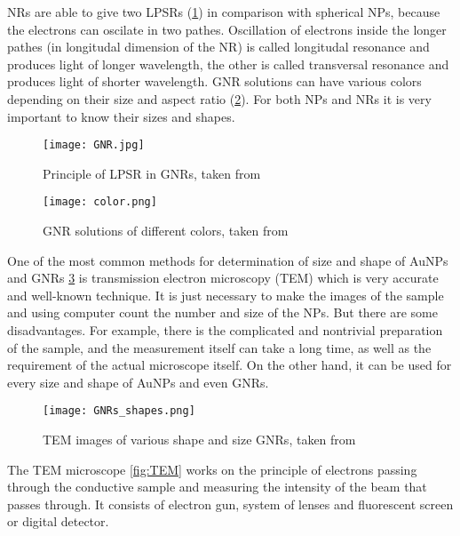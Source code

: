         NRs are able to give two LPSRs (\ref{fig:GNR}) in comparison with spherical NPs, because the electrons can oscilate in two pathes. Oscillation of electrons inside the longer pathes
        (in longitudal dimension of the NR) is called longitudal resonance and produces light of longer wavelength, the other is called transversal resonance and
        produces light of shorter wavelength. GNR solutions can have various colors depending on their size and aspect ratio (\ref{fig:color}). \cite{4, 5, 6, 7, 8}
        For both NPs and NRs it is very important to know their sizes and shapes.
        
        \begin{figure}[h]
            \texttt{[image: GNR.jpg]}
            \caption{Principle of LPSR in GNRs, taken from \cite{19}}
            \label{fig:GNR}
        \end{figure}

        \begin{figure}[h]
            \texttt{[image: color.png]}
            \caption{GNR solutions of different colors, taken from \cite{32}}
            \label{fig:color}
        \end{figure}

        One of the most common methods for determination of size and shape of AuNPs and GNRs \ref{fig:GNR_shape} is transmission electron microscopy (TEM) which is very accurate and well-known technique.
        It is just necessary to make the images of the sample and using computer count the number and size of the NPs. But there are some disadvantages. For example,
        there is the complicated and nontrivial preparation of the sample, and the measurement itself can take a long time, as well as the requirement of the actual microscope itself.
        On the other hand, it can be used for every size and shape of AuNPs and even GNRs. \cite{42}

        \begin{figure}[h]
            \texttt{[image: GNRs\_shapes.png]}
            \caption{TEM images of various shape and size GNRs, taken from \cite{20}}
            \label{fig:GNR_shape}
        \end{figure}

        The TEM microscope \ref{fig:TEM} works on the principle of electrons passing through the conductive sample and measuring the intensity of the beam that passes through.
        It consists of electron gun, system of lenses and fluorescent screen or digital detector. \cite{7}

